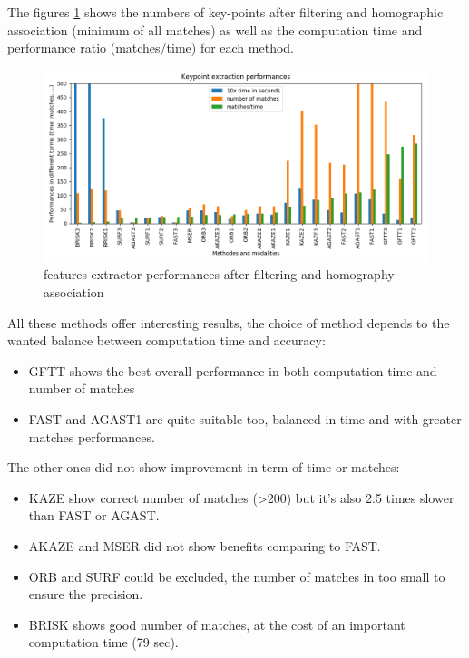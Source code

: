 \documentclass[]{elsarticle}
\begin{document}
	The figures \ref{fig:features-performances} shows the numbers of key-points after filtering and homographic association (minimum of all matches)
	as well as the computation time and performance ratio (matches/time) for each method.
	
	\begin{figure}[H]
		\centering
		\includegraphics[width=0.9\linewidth]{../figures/comparaison-keypoint-performances.png}
		\caption{features extractor performances after filtering and homography association}
		\label{fig:features-performances}
	\end{figure}
	
	All these methods offer interesting results, the choice of method depends to the wanted balance between computation time and accuracy:
	\begin{itemize}
		\item GFTT shows the best overall performance in both computation time and number of matches
		\item FAST and AGAST1 are quite suitable too, balanced in time and with greater matches performances.
	\end{itemize}
	
	\noindent
	The other ones did not show improvement in term of time or matches:
	\begin{itemize}
		\item KAZE show correct number of matches (>200) but it's also 2.5 times slower than FAST or AGAST.
		\item AKAZE and MSER did not show benefits comparing to FAST.
		\item ORB and SURF could be excluded, the number of matches in too small to ensure the precision.
		\item BRISK shows good number of matches, at the cost of an important computation time (79 sec).
	\end{itemize}
	
\end{document}
